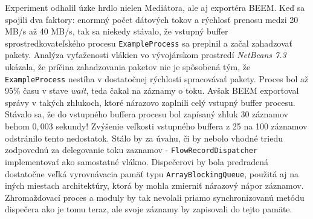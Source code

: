 Experiment odhalil úzke hrdlo nielen Mediátora, ale aj exportéra BEEM. Keď sa spojili dva faktory: 
enormný počet dátových tokov a rýchlosť prenosu medzi 20 MB/s až 40 MB/s, tak sa niekedy stávalo, že vstupný 
buffer sprostredkovateľského procesu \verb|ExampleProcess| sa preplnil a začal zahadzovať pakety. 
Analýza vyťaženosti vlákien vo vývojárskom prostredí \emph{NetBeans 7.3} ukázala, že príčina zahadzovania 
paketov nie je spôsobená tým, že \verb|ExampleProcess| nestíha v dostatočnej rýchlosti spracovávať pakety.
Proces bol až 95\% času v stave \emph{wait}, teda čakal na záznamy o toku. Avšak BEEM exportoval správy
v takých zhlukoch, ktoré nárazovo zaplnili celý vstupný buffer procesu. Stávalo sa, že do vstupného
buffera procesu bol zapísaný zhluk 30 záznamov behom $0,003$ sekundy!
%
Zvýšenie veľkosti vstupného buffera z 25 na 100 záznamov odstránilo tento nedostatok. Stálo by za úvahu,
či by nebolo vhodné triedu zodpovednú za delegovanie toku zaznamov - \verb|FlowRecordDispatcher| 
implementovať ako samostatné vlákno. Dispečerovi by bola predradená dostatočne veľká vyrovnávacia pamäť 
typu \verb|ArrayBlockingQueue|, použitá aj na iných miestach architektúry, ktorá by mohla zmierniť 
nárazový nápor záznamov. Zhromažďovací proces a moduly by tak nevolali priamo synchronizovanú metódu
dispečera ako je tomu teraz, ale svoje záznamy by zapisovali do tejto pamäte.

